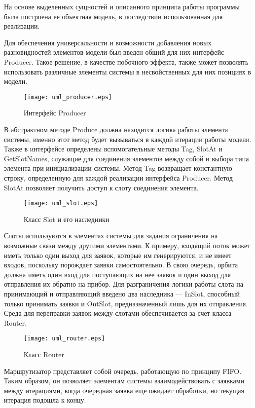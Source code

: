 На основе выделенных сущностей и описанного принципа работы программы была построена ее объектная модель, в последствии использованная для реализации.

Для обеспечения универсальности и возможности добавления новых разновидностей элементов модели был введен общий для них интерфейс Producer. Такое решение, в качестве побочного эффекта, также может позволять использовать различные элементы системы в несвойственных для них позициях в модели.
\begin{figure}[H]
	\centering
	\texttt{[image: uml\_producer.eps]}
	\caption{Интерфейс Producer}
	\label{uml_producer}
\end{figure}

В абстрактном методе Produce должна находится логика работы элемента системы, именно этот метод будет вызываться в каждой итерации работы модели. Также в интерфейсе определены вспомогательные методы Tag, SlotAt и GetSlotNames, служащие для соединения элементов между собой и выбора типа элемента при инициализации системы. Метод Tag возвращает константную строку, определенную для каждой реализации интерфейса Producer. Метод SlotAt позволяет получить доступ к слоту соединения элемента.
\begin{figure}[H]
	\centering
	\texttt{[image: uml\_slot.eps]}
	\caption{Класс Slot и его наследники}
	\label{uml_slot}
\end{figure}

Слоты используются в элементах системы для задания ограничения на возможные связи между другими элементами. К примеру, входящий поток может иметь только один выход для заявок, которые им генерируются, и не имеет входов, поскольку порождает заявки самостоятельно. В свою очередь, орбита должна иметь один вход для поступающих на нее заявок и один выход для отправления их обратно на прибор. Для разграничения логики работы слота на принимающий и отправляющий введено два наследника --- InSlot, способный только принимать заявки и OutSlot, предназначенный лишь для их отправления. Среда для переправки заявок между слотами обеспечивается за счет класса Router.
\begin{figure}[H]
	\centering
	\texttt{[image: uml\_router.eps]}
	\caption{Класс Router}
	\label{uml_router}
\end{figure}
Маршрутизатор представляет собой очередь, работающую по принципу FIFO. Таким образом, он позволяет элементам системы взаимодействовать с заявками между итерациями, когда очередная заявка еще ожидает обработки, но текущая итерация подошла к концу.

